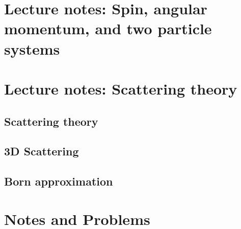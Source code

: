 \part{Lecture notes: Spin, angular momentum, and two particle systems}
   
   
   
   
   
   
   
   
   
   

\part{Lecture notes: Scattering theory}
   \chapter{Scattering theory}
      
      
   \chapter{3D Scattering}
      
      
   \chapter{Born approximation}
      

\part{Notes and Problems}
   
   
   
   
   
   
   
   
   
   
   
   
   
   
   
   
